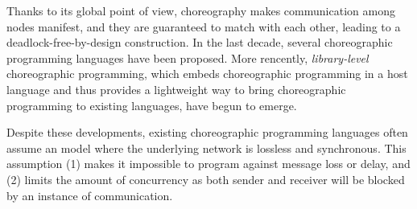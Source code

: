 Thanks to its global point of view, choreography makes communication among nodes manifest, and they are guaranteed to match with each other, leading to a deadlock-free-by-design construction.
%
In the last decade, several choreographic programming languages have been proposed.
%
More rencently, \emph{library-level} choreographic programming, which embeds choreographic programming in a host language and thus provides a lightweight way to bring choreographic programming to existing languages, have begun to emerge.

Despite these developments, existing choreographic programming languages often assume an model where the underlying network is lossless and synchronous.
%
This assumption (1) makes it impossible to program against message loss or delay, and (2) limits the amount of concurrency as both sender and receiver will be blocked by an instance of communication.
%

